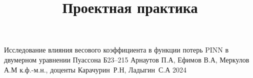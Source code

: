\documentclass[a4paper,12pt]{memoir}
\begin{document}
\renewcommand{\contentsname}{{\Large{Содержание}\hfill}}

\title {Проектная практика}
{Исследование влияния весового коэффициента в функции потерь PINN в двумерном уравнении Пуассона}
{Б23--215}
{Арнаутов П.А, Ефимов В.А, Меркулов А.М}
{к.ф.-м.н., доценты}
{Карачурин Р.Н, Ладыгин С.А}
{2024}







\end{document}
